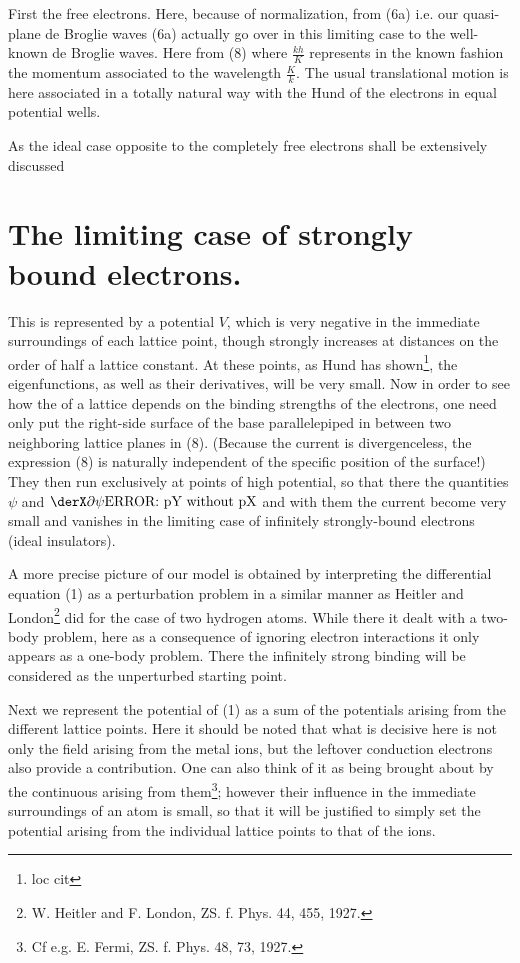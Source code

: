 \begin{paper}{1}
First the free electrons. Here, because of normalization, from (6a)
i.e. our quasi-plane de Broglie waves (6a) actually go over in this limiting case to the well-known de Broglie waves. Here from (8)
where $\frac{kh}{K}$ represents in the known fashion the momentum associated to the wavelength $\frac{K}{k}$. The usual translational motion is here associated in a totally natural way with the Hund  of the electrons in equal potential wells.

As the ideal case opposite to the completely free electrons shall be extensively discussed 

\section{The limiting case of strongly bound electrons.}
This is represented by a potential $V$, which is very negative in the immediate surroundings of each lattice point, though strongly increases at distances on the order of half a lattice constant. At these points, as Hund has shown\footnote{loc cit}, the eigenfunctions, as well as their derivatives, will be very small. Now in order to see how the  of a lattice depends on the binding strengths of the electrons, one need only put the right-side surface of the base parallelepiped in between two neighboring lattice planes in (8). (Because the current is divergenceless, the expression (8) is naturally independent of the specific position of the surface!) They then run exclusively at points of high potential, so that there the quantities $\psi$ and $\pX\psi\pY{x}$ and with them the current become very small and vanishes in the limiting case of infinitely strongly-bound electrons (ideal insulators).

A more precise picture of our model is obtained by interpreting the differential equation (1) as a perturbation problem in a similar manner  as Heitler and London\footnote{W. Heitler and F. London, ZS. f. Phys. 44, 455, 1927.} did for the case of two hydrogen atoms. While there it dealt with a two-body problem, here as a consequence of ignoring electron interactions it only appears as a one-body problem. There the infinitely strong binding will be considered as the unperturbed starting point.

Next we represent the potential of (1) as a sum of the potentials arising from the different lattice points. Here it should be noted that what is decisive here is not only the field arising from the metal ions, but the leftover conduction electrons also provide a contribution. One can also think of it as being brought about by the continuous  arising from them\footnote{Cf e.g. E. Fermi, ZS. f. Phys. 48, 73, 1927.}; however their influence in the immediate surroundings of an atom is small, so that it will be justified to simply set the potential arising from the individual lattice points to that of the ions.


\end{paper}
